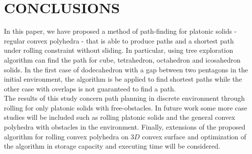 
\section{CONCLUSIONS}
In this paper, we have proposed a method of path-finding for platonic solids - regular convex polyhedra - that is able to produce paths and a shortest path under rolling constraint without sliding. In particular, using tree exploration algorithm can find the path for cube, tetrahedron, octahedron and icosahedron solids. In the first case of dodecahedron with a gap between two pentagons in the initial environment, the algorithm is be applied to find shortest paths while the other case with overlaps is not guaranteed to find a path.\\


\noindent The results of this study concern path planning in discrete environment through rolling for only platonic solids with free-obstacles.
In future work some more case studies will be included such as rolling platonic solids and the general convex polyhedra with obstacles in the environment. 
Finally, extensions of the proposed algorithm for rolling convex polyhedra on $3D$ convex surface and optimization of the algorithm in storage capacity and executing time will be considered.\\

%
%
%
